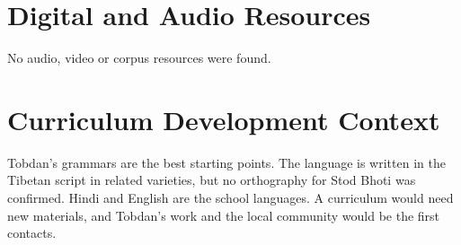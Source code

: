 \documentclass[12pt]{article}
\begin{document}
\section{Digital and Audio Resources}
No audio, video or corpus resources were found.

\section{Curriculum Development Context}
Tobdan's grammars are the best starting points. The language is written in the Tibetan script in related varieties, but no orthography for Stod Bhoti was confirmed. Hindi and English are the school languages. A curriculum would need new materials, and Tobdan's work and the local community would be the first contacts.
\end{document}
